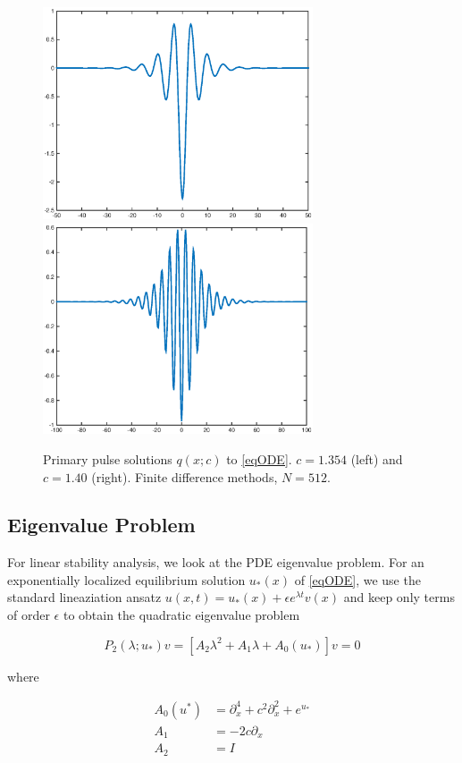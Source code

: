 \documentclass[12pt]{article}
\begin{document}
\begin{figure}[H]
\centering
\includegraphics[width=8cm]{single1354.eps}
\includegraphics[width=8cm]{single14.eps}
\label{fig:single1}
\caption{Primary pulse solutions $q(x;c)$ to \eqref{eqODE}. $c = 1.354$ (left) and $c = 1.40$ (right). Finite difference methods, $N = 512$.}
\end{figure}

\subsection{Eigenvalue Problem}

For linear stability analysis, we look at the PDE eigenvalue problem. For an exponentially localized equilibrium solution $u_*(x)$ of \eqref{eqODE}, we use the standard lineaziation ansatz $u(x,t) = u_*(x) + \epsilon e^{\lambda t} v(x)$ and keep only terms of order $\epsilon$ to obtain the quadratic eigenvalue problem

\begin{equation}\label{quadeig}
P_2(\lambda; u_*)v =  [A_2 \lambda^2 + A_1 \lambda + A_0(u_*)]v = 0
\end{equation}

where

\begin{align}
A_0(u^*) &= \partial_x^4 + c^2 \partial_x^2 + e^{u_*} \\
A_1 &= -2 c \partial_x \\
A_2 &= I
\end{align}
\end{document}
